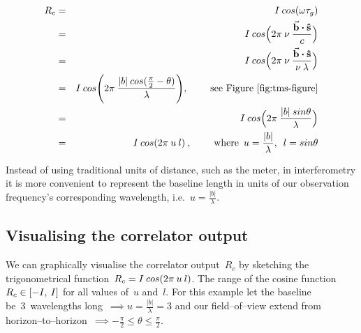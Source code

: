\begin{eqnarray}
  \label{eq:7}
  R_c &=& I \msp cos(\omega \tau _g) \nonumber \\
      &=& I \msp cos\Big (2\pi \msp \nu \msp \frac{\vec{\mathbf{b}} \boldsymbol{\cdot } \mathbf{\hat{s}}}{c}\Big ) \nonumber \\
      &=& I \msp cos\Big (2\pi \msp \nu \msp \frac{\vec{\mathbf{b}} \boldsymbol{\cdot } \mathbf{\hat{s}}}{\nu \msp \lambda}\Big ) \nonumber \\
      &=& I \msp cos\Bigg (2\pi \msp \frac{|b|\msp cos(\frac{\pi }{2} - \theta)}{\lambda}\Bigg ) , \hspace{0.8cm} \mbox{see Figure~\ref{fig:tms-figure}} \nonumber \\
      &=& I \msp cos\Big (2\pi \msp \frac{|b| \msp sin \theta}{\lambda} \Big) \nonumber \\
      &=& I \msp cos(2\pi \msp u \msp l) \msp , \hspace{0.8cm} \mbox{where} \enspace u = \frac{|b|}{\lambda}, \enspace l = sin \theta
\end{eqnarray}

Instead of using traditional units of distance, such as the meter, in interferometry it is more convenient to represent the baseline length in units of our observation frequency's corresponding wavelength, i.e.~$u = \frac{|b|}{\lambda}$.

\subsection{Visualising the correlator output}

We can graphically visualise the correlator output~$R_c$ by sketching the trigonometrical function~$R_c = I \msp cos(2\pi \msp u \msp l)$. The range of the cosine function~$R_c \in [-I, \msp I]$ for all values of~$u$ and~$l$. For this example let the baseline be~3~wavelengths long~$\implies u = \frac{|b|}{\lambda} = 3$ and our field--of--view extend from horizon--to--horizon~$\implies -\frac{\pi}{2} \leq \theta \leq \frac{\pi}{2}$.

